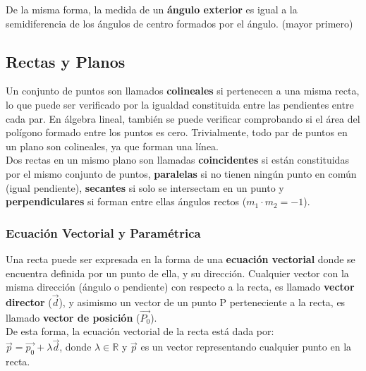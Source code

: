 De la misma forma, la medida de un \textbf{ángulo exterior} es igual a la semidiferencia de los ángulos de centro formados por el ángulo. (mayor primero)\\

\subsection{Rectas y Planos}
Un conjunto de puntos son llamados \textbf{colineales} si pertenecen a una misma recta, lo que puede ser verificado por la igualdad constituida entre las pendientes entre cada par. En álgebra lineal, también se puede verificar comprobando si el área del polígono formado entre los puntos es cero. Trivialmente, todo par de puntos en un plano son colineales, ya que forman una línea.\\

Dos rectas en un mismo plano son llamadas \textbf{coincidentes} si están constituidas por el mismo conjunto de puntos, \textbf{paralelas} si no tienen ningún punto en común (igual pendiente), \textbf{secantes} si solo se intersectam en un punto y \textbf{perpendiculares} si forman entre ellas ángulos rectos ($m_1 \cdot m_2 = -1$).\\

\subsubsection{Ecuación Vectorial y Paramétrica}
Una recta puede ser expresada en la forma de una \textbf{ecuación vectorial} donde se encuentra definida por un punto de ella, y su dirección. Cualquier vector con la misma dirección (ángulo o pendiente) con respecto a la recta, es llamado \textbf{vector director} ($\vec{d}$), y asimismo un vector de un punto P perteneciente a la recta, es llamado \textbf{vector de posición} ($\vec{P_0}$).\\

De esta forma, la ecuación vectorial de la recta está dada por: \\
$\vec{p} = \vec{p_0} + \lambda\vec{d}$, donde $\lambda \in \mathbb{R}$ y $\vec{p}$ es un vector representando cualquier punto en la recta.



